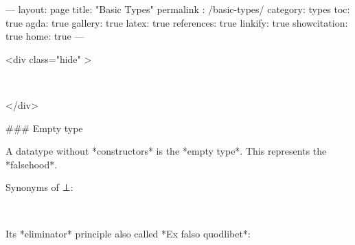 ---
layout: page
title: "Basic Types"
permalink : /basic-types/
category: types
toc: true
agda: true
gallery: true
latex: true
references: true
linkify: true
showcitation: true
home: true
---

<div class="hide" >
\begin{code}%
\>[0]\AgdaSymbol{\{-\#}\AgdaSpace{}%
\AgdaSpace{}%
\AgdaSpace{}%
\AgdaSymbol{\#-\}}\<%
\\
\>[0]\AgdaSpace{}%
\AgdaSpace{}%
\AgdaSpace{}%
\<%
\end{code}
</div>

### Empty type

A datatype without *constructors* is the *empty type*. This represents  the *falsehood*.

\begin{code}%
\>[0]\AgdaSpace{}%
\AgdaSpace{}%
\AgdaSymbol{\{}\AgdaSymbol{\}}\AgdaSpace{}%
\AgdaSymbol{:}\AgdaSpace{}%
\AgdaSpace{}%
\AgdaSpace{}%
\<%
\end{code}

Synonyms of ⊥:
\begin{code}%
\>[0]\AgdaSpace{}%
\AgdaSymbol{=}\AgdaSpace{}%
\<%
\\
\>[0]%
\>[6]\AgdaSymbol{=}\AgdaSpace{}%
\<%
\end{code}

Its *eliminator* principle also called *Ex falso quodlibet*:

\begin{code}%
\>[0]\<%
\\
\>[0][@{}l@{\AgdaIndent{0}}]%
\>[2]\AgdaSymbol{:}\AgdaSpace{}%
\AgdaSpace{}%
\AgdaSymbol{\{}\AgdaSpace{}%
\AgdaSymbol{\}}\AgdaSpace{}%
\AgdaSymbol{\{}\AgdaSpace{}%
\AgdaSymbol{:}\AgdaSpace{}%
\AgdaSpace{}%
\AgdaSymbol{\}}\<%
\\
%
\>[2]\AgdaSpace{}%
\AgdaSpace{}%
\AgdaSymbol{\{}\AgdaSymbol{\}}\<%
\\
%
\>[2]\AgdaComment{--------}\<%
\\
%
\>[2]\AgdaSpace{}%
\<%
\\
%
\\[\AgdaEmptyExtraSkip]%
\>[0]\AgdaSpace{}%
\AgdaSymbol{()}\<%
\end{code}

